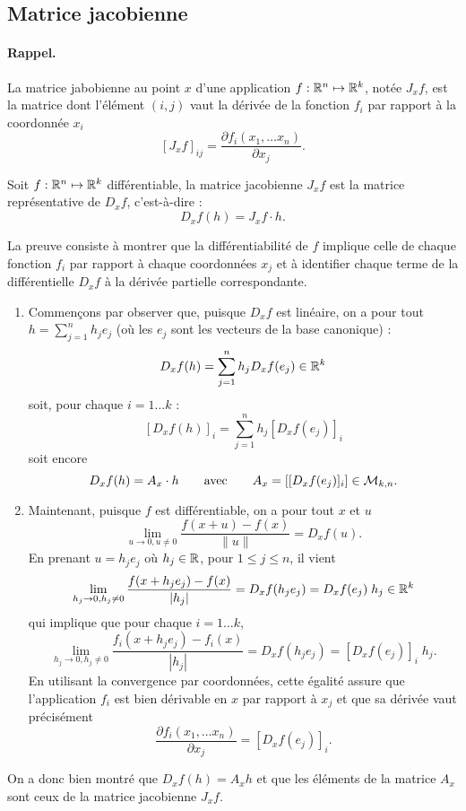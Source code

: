 \subsection{Matrice jacobienne} 

\paragraph*{Rappel.} La matrice jabobienne au point $x$ d'une application $f : \mathbb{R}^n \mapsto \mathbb{R}^k$, notée $J_xf$, est la matrice dont l'élément $(i, j)$ vaut la dérivée de la fonction $f_i$ par rapport à la coordonnée $x_i$
$$
[J_xf]_{ij} = \frac{\partial f_i(x_1, \dots x_n)}{\partial x_j}.
$$

\begin{proposition} \label{prop:matriceJacobienne}
  Soit $f : \mathbb{R}^n \mapsto \mathbb{R}^k$ différentiable, la matrice jacobienne $J_xf$ est la matrice représentative de $D_xf$, c'est-à-dire :
  $$
  D_xf(h) = J_xf \cdot h.
  $$
\end{proposition}

\proof
La preuve consiste à montrer que la différentiabilité de $f$ implique celle de chaque fonction $f_i$ par rapport à chaque coordonnées $x_j$ et à identifier chaque terme de la différentielle $D_xf$ à la dérivée partielle correspondante. 
\begin{enumerate}
  \item Commençons par observer que, puisque $D_x f$ est linéaire, on a pour tout $h = \sum_{j=1}^n h_j e_j$ (où les $e_j$ sont les vecteurs de la base canonique) :
  $$
  D_xf(h) = \sum_{j=1}^n h_j D_xf(e_j) \in \mathbb{R}^k
  $$
  soit, pour chaque $i = 1 \dots k$ :
  $$
  [D_xf(h)]_i = \sum_{j=1}^n h_j [D_xf(e_j)]_i
  $$
  soit encore
  $$
  D_xf(h) = A_x \cdot h
  \qquad \text{avec} \qquad
  A_x = \left[ [D_xf(e_j)]_i \right] \in \mathcal{M}_{k, n}.
  $$
  \item Maintenant, puisque $f$ est différentiable, on a pour tout $x$ et $u$
  $$
  \lim_{u\to 0, u \neq 0} \frac{f(x+u) - f(x)}{\|u\|} = D_xf(u).
  $$
  En prenant $u = h_j e_j$ où $h_j \in \mathbb{R}$, pour $1 \leq j \leq n$, il vient
  $$
  \lim_{h_j\to 0, h_j \neq 0} \frac{f(x+h_j e_j) - f(x)}{|h_j|} = D_xf(h_j e_j)  =  D_xf(e_j) \; h_j \in \mathbb{R}^k
  $$
  qui implique que pour chaque $i = 1 \dots k$, 
  $$
  \lim_{h_j\to 0, h_j \neq 0} \frac{f_i(x+h_j e_j) - f_i(x)}{|h_j|} = D_xf(h_j e_j)  = [D_xf(e_j)]_i \; h_j.
  $$
  En utilisant la convergence par coordonnées, cette égalité assure que l'application $f_i$ est bien dérivable en $x$ par rapport à $x_j$ et que sa dérivée vaut précisément
  $$
  \frac{\partial f_i(x_1, \dots x_n)}{\partial x_j} = [D_xf(e_j)]_i.
  $$
\end{enumerate}
On a donc bien montré que $D_xf(h) = A_x h$ et que les éléments de la matrice $A_x$ sont ceux de la matrice jacobienne $J_xf$.
\eproof

